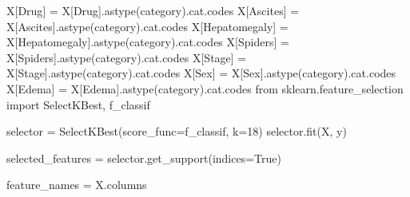 \documentclass[
  letterpaper,
]{krantz}
\makeatletter
\newenvironment{Shaded}{\begin{snugshade}}{\end{snugshade}}
\newcommand{\DecValTok}[1]{\textcolor[rgb]{0.68,0.00,0.00}{#1}}
\newcommand{\ImportTok}[1]{\textcolor[rgb]{0.00,0.46,0.62}{#1}}
\newcommand{\NormalTok}[1]{\textcolor[rgb]{0.00,0.23,0.31}{#1}}
\newcommand{\OperatorTok}[1]{\textcolor[rgb]{0.37,0.37,0.37}{#1}}
\newcommand{\StringTok}[1]{\textcolor[rgb]{0.13,0.47,0.30}{#1}}
\newcommand{\VariableTok}[1]{\textcolor[rgb]{0.07,0.07,0.07}{#1}}
\newenvironment{kframe}{%
\medskip{}
\setlength{\fboxsep}{.8em}
 \def\at@end@of@kframe{}%
 \ifinner\ifhmode%
  \def\at@end@of@kframe{\end{minipage}}%
  \begin{minipage}{\columnwidth}%
 \fi\fi%
 \def\FrameCommand##1{\hskip\@totalleftmargin \hskip-\fboxsep
 \colorbox{shadecolor}{##1}\hskip-\fboxsep
     \hskip-\linewidth \hskip-\@totalleftmargin \hskip\columnwidth}%
 \MakeFramed {\advance\hsize-\width
   \@totalleftmargin\z@ \linewidth\hsize
   \@setminipage}}%
 {\par\unskip\endMakeFramed%
 \at@end@of@kframe}
\renewenvironment{Shaded}{\begin{kframe}}{\end{kframe}}
\makeatother
\begin{document}
\begin{Shaded}
\begin{Highlighting}[]
\NormalTok{X[}\StringTok{\textquotesingle{}Drug\textquotesingle{}}\NormalTok{] }\OperatorTok{=}\NormalTok{ X[}\StringTok{\textquotesingle{}Drug\textquotesingle{}}\NormalTok{].astype(}\StringTok{\textquotesingle{}category\textquotesingle{}}\NormalTok{).cat.codes}
\NormalTok{X[}\StringTok{\textquotesingle{}Ascites\textquotesingle{}}\NormalTok{] }\OperatorTok{=}\NormalTok{ X[}\StringTok{\textquotesingle{}Ascites\textquotesingle{}}\NormalTok{].astype(}\StringTok{\textquotesingle{}category\textquotesingle{}}\NormalTok{).cat.codes}
\NormalTok{X[}\StringTok{\textquotesingle{}Hepatomegaly\textquotesingle{}}\NormalTok{] }\OperatorTok{=}\NormalTok{ X[}\StringTok{\textquotesingle{}Hepatomegaly\textquotesingle{}}\NormalTok{].astype(}\StringTok{\textquotesingle{}category\textquotesingle{}}\NormalTok{).cat.codes}
\NormalTok{X[}\StringTok{\textquotesingle{}Spiders\textquotesingle{}}\NormalTok{] }\OperatorTok{=}\NormalTok{ X[}\StringTok{\textquotesingle{}Spiders\textquotesingle{}}\NormalTok{].astype(}\StringTok{\textquotesingle{}category\textquotesingle{}}\NormalTok{).cat.codes}
\NormalTok{X[}\StringTok{\textquotesingle{}Stage\textquotesingle{}}\NormalTok{] }\OperatorTok{=}\NormalTok{ X[}\StringTok{\textquotesingle{}Stage\textquotesingle{}}\NormalTok{].astype(}\StringTok{\textquotesingle{}category\textquotesingle{}}\NormalTok{).cat.codes}
\NormalTok{X[}\StringTok{\textquotesingle{}Sex\textquotesingle{}}\NormalTok{] }\OperatorTok{=}\NormalTok{ X[}\StringTok{\textquotesingle{}Sex\textquotesingle{}}\NormalTok{].astype(}\StringTok{\textquotesingle{}category\textquotesingle{}}\NormalTok{).cat.codes}
\NormalTok{X[}\StringTok{\textquotesingle{}Edema\textquotesingle{}}\NormalTok{] }\OperatorTok{=}\NormalTok{ X[}\StringTok{\textquotesingle{}Edema\textquotesingle{}}\NormalTok{].astype(}\StringTok{\textquotesingle{}category\textquotesingle{}}\NormalTok{).cat.codes}
\ImportTok{from}\NormalTok{ sklearn.feature\_selection }\ImportTok{import}\NormalTok{ SelectKBest, f\_classif}


\NormalTok{selector }\OperatorTok{=}\NormalTok{ SelectKBest(score\_func}\OperatorTok{=}\NormalTok{f\_classif, k}\OperatorTok{=}\DecValTok{18}\NormalTok{)  }
\NormalTok{selector.fit(X, y)}

\NormalTok{selected\_features }\OperatorTok{=}\NormalTok{ selector.get\_support(indices}\OperatorTok{=}\VariableTok{True}\NormalTok{)}

\NormalTok{feature\_names }\OperatorTok{=}\NormalTok{ X.columns}



\end{Highlighting}
\end{Shaded}
\end{document}
